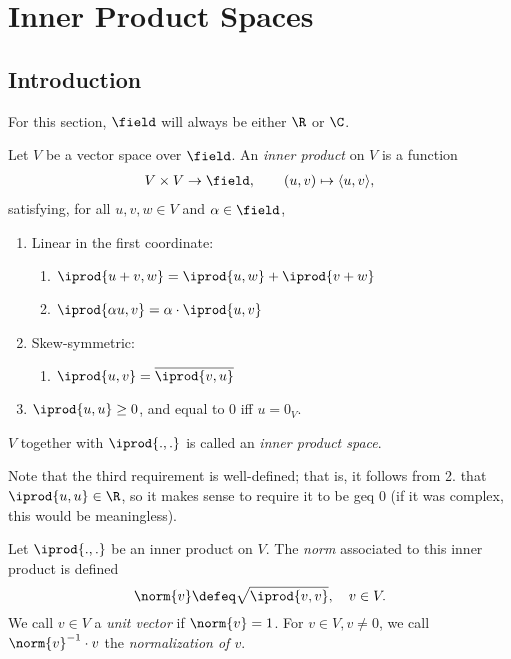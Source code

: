 \section{Inner Product Spaces}

\subsection{Introduction}

For this section, $\field$ will always be either $\R$ or $\C$.

\begin{definition}
    Let $V$ be a vector space over $\field$. An \emph{inner product} on $V$ is a function \begin{align*}
        V \times V  \to \field, \qquad (u, v) \mapsto \langle u, v\rangle,
    \end{align*}
    satisfying, for all $u, v,w \in V$ and $\alpha \in \field$, 
    \begin{enumerate}
        \item Linear in the first coordinate:
        \begin{enumerate}
            \item $\iprod{u + v, w} = \iprod{u,w} + \iprod{v + w}$
            \item $\iprod{\alpha u, v} = \alpha \cdot \iprod{u, v}$
        \end{enumerate}
        \item Skew-symmetric:
        \begin{enumerate}
            \item $\iprod{u, v} = \overline{\iprod{v, u}}$
        \end{enumerate}
        \item $\iprod{u, u} \geq 0$, and equal to $0$ iff $u = 0_V$.
    \end{enumerate}
    $V$ together with $\iprod{.,.}$ is called an \emph{inner product space}.
\end{definition}

\begin{remark}
 Note that the third requirement is well-defined; that is, it follows from 2. that $\iprod{u,u} \in \R$, so it makes sense to require it to be geq 0 (if it was complex, this would be meaningless).
\end{remark}

\begin{definition}
    Let $\iprod{.,.}$ be an inner product on $V$. The \emph{norm} associated to this inner product is defined \[
    \norm{v} \defeq \sqrt{\iprod{v,v}}, \quad v \in V.
    \]
    We call $v \in V$ a \emph{unit vector} if $\norm{v} = 1$. For $v \in V, v \neq 0$, we call $\norm{v}^{-1} \cdot v$ the \emph{normalization of $v$}.
\end{definition}

